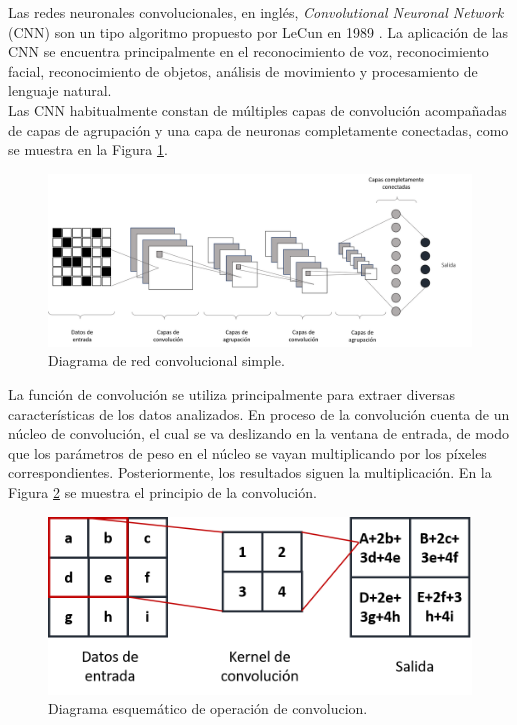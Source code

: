 Las redes neuronales convolucionales, en inglés, \textit{Convolutional Neuronal Network} (CNN) son un tipo algoritmo propuesto por LeCun en 1989 \citep{lecun1989backpropagation}. La aplicación de las CNN se encuentra principalmente en el reconocimiento de voz, reconocimiento facial, reconocimiento de objetos, análisis de movimiento y procesamiento de lenguaje natural.\\

Las CNN habitualmente constan de múltiples capas de convolución acompañadas de capas de agrupación y una capa de neuronas completamente conectadas, como se muestra en la Figura \ref{fig:CNN}.

  \begin{figure}[!h]
     \centering
     \includegraphics[width=.9\textwidth]{Imagenes/CNN.png}
     \caption{Diagrama de red convolucional simple.}
     \label{fig:CNN}
 \end{figure}

 La función de convolución se utiliza principalmente para extraer diversas características de los datos analizados. En proceso de la convolución cuenta de un núcleo de convolución, el cual se va deslizando en la ventana de entrada, de modo que los parámetros de peso en el núcleo se vayan multiplicando por los píxeles correspondientes. Posteriormente, los resultados siguen la multiplicación. En la Figura \ref{fig:Convolution} se muestra el principio de la convolución.\\

 \begin{figure}[!h]
     \centering
     \includegraphics[width=.5\textwidth]{Imagenes/Convolucion.png}
     \caption{Diagrama esquemático de operación de convolucion.}
     \label{fig:Convolution}
 \end{figure}


